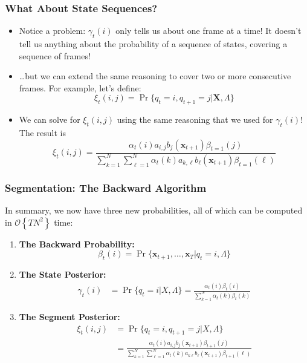 \documentclass{beamer}
\begin{document}
\begin{frame}
  \frametitle{What About State Sequences?}

  \begin{itemize}
  \item Notice a problem: $\gamma_t(i)$ only tells us about one frame at a time!  It doesn't tell
    us anything about the probability of a sequence of states, covering a sequence of frames!
  \item \ldots but we can extend the same reasoning to cover two or
    more consecutive frames.  For example, let's define:
    \[
    \xi_t(i,j) = \Pr\{q_t=i,q_{t+1}=j|\mathbf{X},\Lambda\}
    \]
    \item We can solve for $\xi_t(i,j)$ using the same reasoning that
      we used for $\gamma_t(i)$!  The result is
      \begin{displaymath}
        \xi_t(i,j)=\frac{\alpha_t(i)a_{i,j}b_{j}(\mathbf{x}_{t+1})\beta_{t=1}(j)}{\sum_{k=1}^N\sum_{\ell=1}^N\alpha_t(k)a_{k,\ell}b_{\ell}(\mathbf{x}_{t+1})\beta_{t=1}(\ell)}
      \end{displaymath}
  \end{itemize}
\end{frame}

\begin{frame}
  \frametitle{Segmentation: The Backward Algorithm}

  In summary, we now have three new probabilities, all of which can be
  computed in ${\mathcal O}\left\{TN^2\right\}$ time:
  \begin{enumerate}
  \item {\bf The Backward Probability:}
    \[
    \beta_t(i) = \Pr\{\mathbf{x}_{t+1},\ldots,\mathbf{x}_T|q_t=i,\Lambda\}
    \]
  \item {\bf The State Posterior:}
    \begin{align*}
      \gamma_t(i) & = \Pr\{q_t=i|X,\Lambda\}
      = \frac{\alpha_t(i)\beta_t(i)}{\sum_{k=1}^N\alpha_t(k)\beta_t(k)}
    \end{align*}
  \item {\bf The Segment Posterior:}
    \begin{align*}
      \xi_t(i,j) & = \Pr\{q_t=i,q_{t+1}=j|X,\Lambda\}\\
      &= \frac{\alpha_t(i)a_{i,j}b_j(\mathbf{x}_{t+1})\beta_{t+1}(j)}{\sum_{k=1}^N\sum_{\ell=1}^N\alpha_t(k)a_{k\ell}b_\ell(\mathbf{x}_{t+1})\beta_{t+1}(\ell)}
    \end{align*}
  \end{enumerate}
\end{frame}
\end{document}
